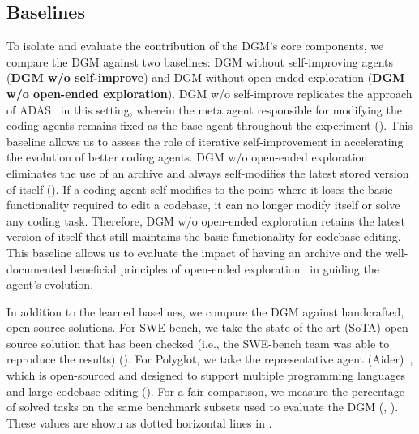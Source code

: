 \documentclass{article} %
\begin{document}
\subsection{Baselines}
\label{sec:baselines}

To isolate and evaluate the contribution of the DGM's core components, we compare the DGM against two baselines: DGM without self-improving agents (\textbf{DGM w/o self-improve}) and DGM without open-ended exploration (\textbf{DGM w/o open-ended exploration}). DGM w/o self-improve replicates the approach of ADAS~\citep{hu2025automated} in this setting, wherein the meta agent responsible for modifying the coding agents remains fixed as the base agent throughout the experiment (). This baseline allows us to assess the role of iterative self-improvement in accelerating the evolution of better coding agents. DGM w/o open-ended exploration eliminates the use of an archive and always self-modifies the latest stored version of itself (). If a coding agent self-modifies to the point where it loses the basic functionality required to edit a codebase, it can no longer modify itself or solve any coding task. Therefore, DGM w/o open-ended exploration retains the latest version of itself that still maintains the basic functionality for codebase editing. This baseline allows us to evaluate the impact of having an archive and the well-documented beneficial principles of open-ended exploration~\citep{clune2019ai, stanley2015greatness, zhang2024omni, fernandopromptbreeder, lee2020learning, samvelyan2024rainbow, colas2022autotelic} in guiding the agent's evolution.

In addition to the learned baselines, we compare the DGM against handcrafted, open-source solutions. For SWE-bench, we take the state-of-the-art (SoTA) open-source solution that has been checked (i.e., the SWE-bench team was able to reproduce the results) (). For Polyglot, we take the representative agent (Aider)~\citep{aider2024}, which is open-sourced and designed to support multiple programming languages and large codebase editing (). For a fair comparison, we measure the percentage of solved tasks on the same benchmark subsets used to evaluate the DGM (, ). These values are shown as dotted horizontal lines in .
\end{document}
